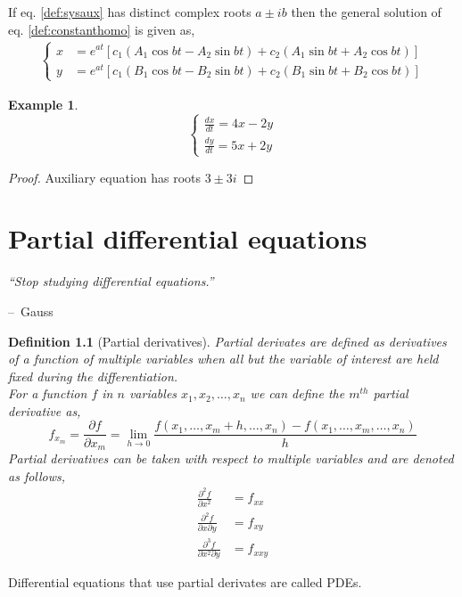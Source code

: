 \documentclass[oneside,11pt,pdftex,final]{book}%
\makeatletter
\numberwithin{equation}{section}
\newenvironment{chapquote}[2][2em]
{\setlength{\@tempdima}{#1}%
	\def\chapquote@author{#2}%
	\parshape 1 \@tempdima \dimexpr\textwidth-2\@tempdima\relax%
	\itshape}
{\par\normalfont\hfill--\ \chapquote@author\hspace*{\@tempdima}\par\bigskip}
\newtheorem{example}[theorem]{Example}
\newtheorem{definition}[theorem]{Definition}
\numberwithin{section}{chapter}
\numberwithin{equation}{chapter}
\makeatother
\begin{document}
If eq. \ref{def:sysaux} has distinct complex roots $a\pm ib $ then the general solution of eq. \ref{def:constanthomo} is given as,
\begin{align*}
	\begin{cases}
		x&=e^{at}[c_1(A_1 \cos bt - A_2 \sin bt)+c_2(A_1 \sin bt + A_2 \cos bt)]\\
		y&=e^{at}[c_1(B_1 \cos bt- B_2 \sin bt)+c_2(B_1 \sin bt + B_2 \cos bt)]
	\end{cases}
\end{align*}

\begin{example}
	\[ \begin{cases}
		\frac{dx}{dt}=4x-2y\\
		\frac{dy}{dt}=5x+2y
	\end{cases} \]
\end{example}
\begin{proof}
	Auxiliary equation has roots $ 3\pm 3i $
\end{proof}
	
\chapter{Partial differential equations}

\begin{chapquote}{Gauss}
	``Stop studying differential equations.''
\end{chapquote}


\begin{definition}[Partial derivatives]
	Partial derivates are defined as derivatives of a function of multiple variables when all but the variable of interest are held fixed during the differentiation.\\
	For a function $ f $ in $ n $ variables $ x_1,x_2,\dots, x_n $ we can define the $ m^{th} $ partial derivative as,
	\[ f_{x_m}=\frac{\partial f}{\partial x_m} = \lim_{h \rightarrow 0}\frac{f(x_1,\dots, x_m+h,\dots,x_n)-f(x_1,\dots,x_m, \dots,x_n)}{h}\]
	Partial derivatives can be taken with respect to multiple variables and are denoted as follows,
	\begin{align*}
		\frac{\partial^2 f}{\partial x^2}&=f_{xx}\\
		\frac{\partial^2 f}{\partial x \partial y}&=f_{xy}\\
		\frac{\partial^3 f}{\partial x^2 \partial y}&=f_{xxy}
	\end{align*}
\end{definition}
Differential equations that use partial derivates are called PDEs.
\end{document}

